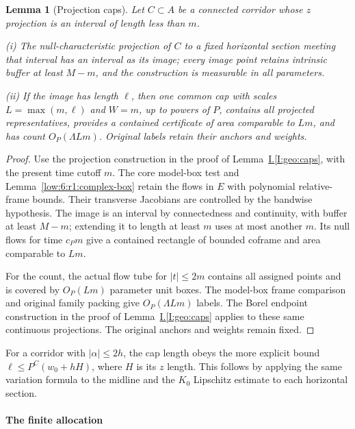 \documentclass[11pt]{amsart}
\newtheorem{lemma}[theorem]{Lemma}
\theoremstyle{definition}
\theoremstyle{remark}
\numberwithin{equation}{section}
\newcommand{\partIref}[1]{\hyperref[I:#1]{I.\ref*{I:#1}}}
\begin{document}
\begin{lemma}[Projection caps]\label{low:6:og:caps}
Let $C\subset A$ be a connected corridor whose $z$ projection is an interval of length less than $m$.

\noindent\textup{(i)} The null-characteristic projection of $C$ to a fixed horizontal section meeting that interval has an interval as its image; every image point retains intrinsic buffer at least $M-m$, and the construction is measurable in all parameters.

\noindent\textup{(ii)} If the image has length $\ell$, then one common cap with scales $L=\max(m,\ell)$ and $W=m$, up to powers of $P$, contains all projected representatives, provides a contained certificate of area comparable to $Lm$, and has count $O_P(\Lambda Lm)$. Original labels retain their anchors and weights.
\end{lemma}
\begin{proof}
Use the projection construction in the proof of Lemma~\partIref{geo:caps}, with the present time cutoff $m$. The core model-box test and Lemma~\ref{low:6:r1:complex-box} retain the flows in $E$ with polynomial relative-frame bounds. Their transverse Jacobians are controlled by the bandwise hypothesis. The image is an interval by connectedness and continuity, with buffer at least $M-m$; extending it to length at least $m$ uses at most another $m$. Its null flows for time $c_Pm$ give a contained rectangle of bounded coframe and area comparable to $Lm$.

For the count, the actual flow tube for $|t|\le2m$ contains all assigned points and is covered by $O_P(Lm)$ parameter unit boxes. The model-box frame comparison and original family packing give $O_P(\Lambda Lm)$ labels. The Borel endpoint construction in the proof of Lemma~\partIref{geo:caps} applies to these same continuous projections. The original anchors and weights remain fixed.
\end{proof}

For a corridor with $|\alpha|\le2h$, the cap length obeys the more explicit bound $\ell\le P^C(w_0+hH)$, where $H$ is its $z$ length. This follows by applying the same variation formula to the midline and the $K_0$ Lipschitz estimate to each horizontal section. 

\paragraph{The finite allocation}
\end{document}
